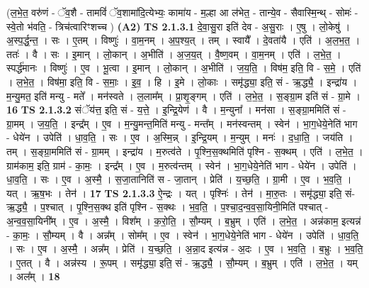\documentclass[17pt]{extarticle}
\begin{document}
                  \newline
                      (ल॒भे॒त॒ वरु॑णं - ॅव॒शै - तामविं॑ ॅव॒शामा॑दि॒त्येभ्यः॒ कामा॑य - म॒ल्हा आ ल॑भेत॒ - तान्ये॒व - सैवास्मि॒न्थ् - सोमः॑ - स्वे॒तो भ॑वति॒ - त्रिच॑त्वारिꣳशच्च )  \textbf{(A2)} \newline \newline
                                \textbf{ TS 2.1.3.1} \newline
                  दे॒वा॒सु॒रा इति॑ देव - अ॒सु॒राः । ए॒षु । लो॒केषु॑ । अ॒स्प॒र्द्ध॒न्त॒ । सः । ए॒तम् । विष्णुः॑ । वा॒म॒नम् । अ॒प॒श्य॒त् । तम् । स्वायै᳚ । दे॒वता॑यै । एति॑ । अ॒ल॒भ॒त॒ । ततः॑ । वै । सः । इ॒मान् । लो॒कान् । अ॒भीति॑ । अ॒ज॒य॒त् । वै॒ष्ण॒वम् । वा॒म॒नम् । एति॑ । ल॒भे॒त॒ । स्पर्द्ध॑मानः । विष्णुः॑ । ए॒व । भू॒त्वा । इ॒मान् । लो॒कान् । अ॒भीति॑ । ज॒य॒ति॒ । विष॑म॒ इति॒ वि - स॒मे॒ । एति॑ । ल॒भे॒त॒ । विष॑मा॒ इति॒ वि - स॒माः॒ । इ॒व॒ । हि । इ॒मे । लो॒काः । समृ॑द्ध्या॒ इति॒ सं - ऋ॒द्ध्यै॒ । इन्द्रा॑य । म॒न्यु॒मत॒ इति॑ मन्यु - मते᳚ । मन॑स्वते । ल॒लाम᳚म् । प्रा॒शृ॒ङ्गम् । एति॑ । ल॒भे॒त॒ । स॒ङ्ग्रा॒म इति॑ सं - ग्रा॒मे । \textbf{  16} \newline
                  \newline
                                \textbf{ TS 2.1.3.2} \newline
                  संॅय॑त्त॒ इति॒ सं - य॒त्ते॒ । इ॒न्द्रि॒येण॑ । वै । म॒न्युना᳚ । मन॑सा । स॒ङ्ग्रा॒ममिति॑ सं - ग्रा॒मम् । ज॒य॒ति॒ । इन्द्र᳚म् । ए॒व । म॒न्यु॒मन्त॒मिति॑ मन्यु - मन्त᳚म् । मन॑स्वन्तम् । स्वेन॑ । भा॒ग॒धेये॒नेति॑ भाग - धेये॑न । उपेति॑ । धा॒व॒ति॒ । सः । ए॒व । अ॒स्मि॒न्न् । इ॒न्द्रि॒यम् । म॒न्युम् । मनः॑ । द॒धा॒ति॒ । जय॑ति । तम् । स॒ङ्ग्रा॒ममिति॑ सं - ग्रा॒मम् । इन्द्रा॑य । म॒रुत्व॑ते । पृ॒श्नि॒स॒क्थमिति॑ पृश्नि - स॒क्थम् । एति॑ । ल॒भे॒त॒ । ग्राम॑काम॒ इति॒ ग्राम॑ - का॒मः॒ । इन्द्र᳚म् । ए॒व । म॒रुत्व॑न्तम् । स्वेन॑ । भा॒ग॒धेये॒नेति॑ भाग - धेये॑न । उपेति॑ । धा॒व॒ति॒ । सः । ए॒व । अ॒स्मै॒ । स॒जा॒तानिति॑ स - जा॒तान् । प्रेति॑ । य॒च्छ॒ति॒ । ग्रा॒मी । ए॒व । भ॒व॒ति॒ । यत् । ऋ॒ष॒भः । तेन॑ । \textbf{  17} \newline
                  \newline
                                \textbf{ TS 2.1.3.3} \newline
                  ऐ॒न्द्रः । यत् । पृश्निः॑ । तेन॑ । मा॒रु॒तः । समृ॑द्ध्या॒ इति॒ सं-ऋ॒द्ध्यै॒ । प॒श्चात् । पृ॒श्नि॒स॒क्थ इति॑ पृश्नि - स॒क्थः । भ॒व॒ति॒ । प॒श्चा॒द॒न्व॒व॒सा॒यिनी॒मिति॑ पश्चात् - अ॒न्व॒व॒सा॒यिनी᳚म् । ए॒व । अ॒स्मै॒ । विश᳚म् । क॒रो॒ति॒ । सौ॒म्यम् । ब॒भ्रुम् । एति॑ । ल॒भे॒त॒ । अन्न॑काम॒ इत्यन्न॑ - का॒मः॒ । सौ॒म्यम् । वै । अन्न᳚म् । सोम᳚म् । ए॒व । स्वेन॑ । भा॒ग॒धेये॒नेति॑ भाग - धेये॑न । उपेति॑ । धा॒व॒ति॒ । सः । ए॒व । अ॒स्मै॒ । अन्न᳚म् । प्रेति॑ । य॒च्छ॒ति॒ । अ॒न्ना॒द इत्य॑न्न - अ॒दः । ए॒व । भ॒व॒ति॒ । ब॒भ्रुः । भ॒व॒ति॒ । ए॒तत् । वै । अन्न॑स्य । रू॒पम् । समृ॑द्ध्या॒ इति॒ सं - ऋ॒द्ध्यै॒ । सौ॒म्यम् । ब॒भ्रुम् । एति॑ । ल॒भे॒त॒ । यम् । अल᳚म् । \textbf{  18} \newline
\end{document}
